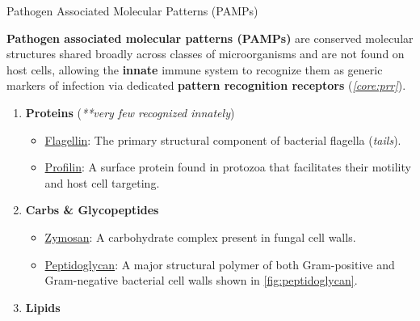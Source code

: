     \begin{core}[label=core:pamp]{Pathogen Associated Molecular Patterns (PAMPs)}

      \textbf{Pathogen associated molecular patterns (PAMPs)} are conserved molecular structures shared broadly across classes of microorganisms and are not found on host cells, allowing the \textbf{innate} immune system to recognize them as generic markers of infection via dedicated \textbf{pattern recognition receptors} (\textit{\autoref{core:prr}}).

      \begin{enumerate}

        \item \textbf{Proteins} (\textit{**very few recognized innately})

          \begin{itemize}

            \item \ul{Flagellin}: The primary structural component of bacterial flagella (\textit{tails}).

            \item \ul{Profilin}: A surface protein found in protozoa that facilitates their motility and host cell targeting.

          \end{itemize}

        \item \textbf{Carbs \& Glycopeptides}

          \begin{itemize}

            \item \ul{Zymosan}: A carbohydrate complex present in fungal cell walls.

            \vspace{-0.5cm}

            \item \ul{Peptidoglycan}: A major structural polymer of both Gram-positive and Gram-negative bacterial cell walls shown in \autoref{fig:peptidoglycan}.

          \end{itemize}

        \item \textbf{Lipids}


\end{enumerate}
\end{core}
